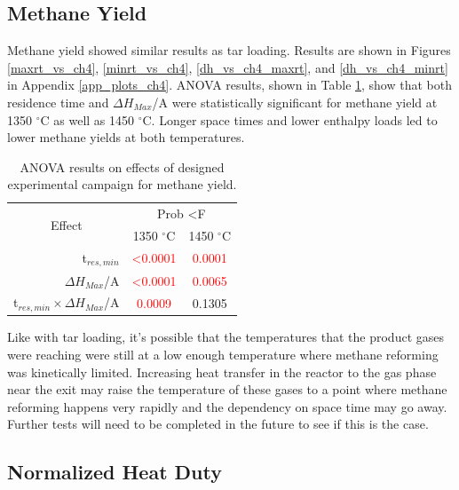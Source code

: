 \documentclass[11pt,twocolumn]{article}
\begin{document}

\subsection*{Methane Yield}

Methane yield showed similar results as tar loading.  Results are shown in Figures \ref{maxrt_vs_ch4}, \ref{minrt_vs_ch4}, \ref{dh_vs_ch4_maxrt}, and \ref{dh_vs_ch4_minrt} in Appendix \ref{app_plots_ch4}.  ANOVA results, shown in Table \ref{anova_ch4}, show that both residence time and $\Delta H_{Max}$/A were statistically significant for methane yield at 1350  $^\circ$C as well as 1450  $^\circ$C.  Longer space times and lower enthalpy loads led to lower methane yields at both temperatures.

\begin{table}
	\centering
	\caption{ANOVA results on effects of designed experimental campaign for methane yield.}
	\begin{tabular}{r c c}
		\toprule
		\multicolumn{1}{c}{\multirow{2}{*}{Effect}}		& 	\multicolumn{2}{c}{Prob \textless F	}	\\
		{}								&	1350 $^\circ$C	&	1450 $^\circ$C			\\
		\midrule
		t$_{res,min}$						&	\textcolor{red}{\textless 0.0001}	&	\textcolor{red}{0.0001}	\\
		$\Delta H_{Max}$/A					&	\textcolor{red}{\textless 0.0001}	&	\textcolor{red}{0.0065}	\\
		t$_{res,min}\times \Delta H_{Max}$/A	&	\textcolor{red}{0.0009}			&	0.1305				\\
		\bottomrule
	\end{tabular}
	\label{anova_ch4}
\end{table}
 
Like with tar loading, it's possible that the temperatures that the product gases were reaching were still at a low enough temperature where methane reforming was kinetically limited.  Increasing heat transfer in the reactor to the gas phase near the exit may raise the temperature of these gases to a point where methane reforming happens very rapidly and the dependency on space time may go away.  Further tests will need to be completed in the future to see if this is the case.

\subsection*{Normalized Heat Duty}
\end{document}
